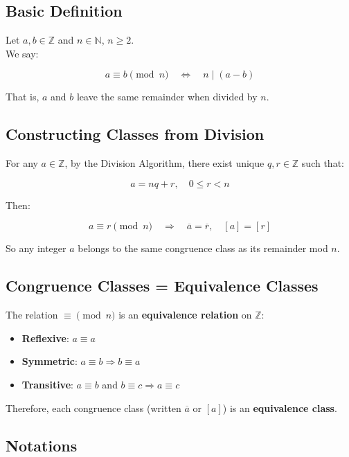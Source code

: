 \documentclass[]{article}
\author{}
\date{}
\providecommand{\tightlist}{%
  \setlength{\itemsep}{0pt}\setlength{\parskip}{0pt}}
\begin{document}
\subsection{Basic Definition}\label{basic-definition}

Let \(a, b \in \mathbb{Z}\) and \(n \in \mathbb{N}\), \(n \geq 2\).\\
We say:

\[
a \equiv b \pmod{n} \quad \Leftrightarrow \quad n \mid (a - b)
\]

That is, \(a\) and \(b\) leave the same remainder when divided by \(n\).

\subsection{Constructing Classes from
Division}\label{constructing-classes-from-division}

For any \(a \in \mathbb{Z}\), by the Division Algorithm, there exist
unique \(q, r \in \mathbb{Z}\) such that:

\[
a = nq + r, \quad 0 \leq r < n
\]

Then:

\[
a \equiv r \pmod{n} \quad \Rightarrow \quad \overline{a} = \overline{r}, \quad [a] = [r]
\]

So any integer \(a\) belongs to the same congruence class as its
remainder mod \(n\).

\subsection{Congruence Classes = Equivalence Classes
}\label{congruence-classes-equivalence-classes}

The relation \(\equiv \pmod{n}\) is an \textbf{equivalence relation} on
\(\mathbb{Z}\):

\begin{itemize}
\tightlist
\item
  \textbf{Reflexive}: \(a \equiv a\)
\item
  \textbf{Symmetric}: \(a \equiv b \Rightarrow b \equiv a\)
\item
  \textbf{Transitive}: \(a \equiv b\) and
  \(b \equiv c \Rightarrow a \equiv c\)
\end{itemize}

Therefore, each congruence class (written \(\overline{a}\) or \([a]\))
is an \textbf{equivalence class}.

\subsection{Notations}\label{notations}
\end{document}
